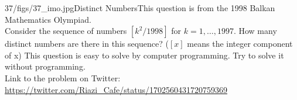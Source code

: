 \begin{problem}{37/figs/37_imo.jpg}{Distinct Numbers}This question is from the 1998 Balkan Mathematics Olympiad.\\[0.2cm]

Consider the sequence of numbers $[k^2/1998]$ for $k = 1, \ldots, 1997$. How many distinct numbers are there in this sequence? ($[x]$ means the integer component of x) This question is easy to solve by computer programming. Try to solve it without programming.\\[0.2cm]

Link to the problem on Twitter:  \url{https://twitter.com/Riazi_Cafe/status/1702560431720759369}\end{problem}